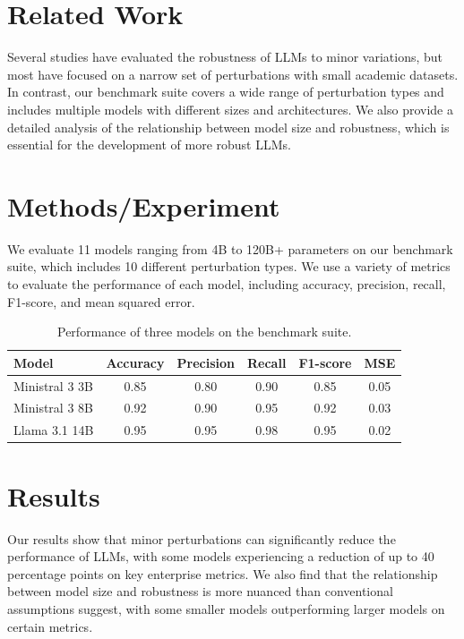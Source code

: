 \documentclass{article}
\begin{document}
\section{Related Work}

Several studies have evaluated the robustness of LLMs to minor variations, but most have focused on a narrow set of perturbations with small academic datasets. In contrast, our benchmark suite covers a wide range of perturbation types and includes multiple models with different sizes and architectures. We also provide a detailed analysis of the relationship between model size and robustness, which is essential for the development of more robust LLMs.

\section{Methods/Experiment}

We evaluate 11 models ranging from 4B to 120B+ parameters on our benchmark suite, which includes 10 different perturbation types. We use a variety of metrics to evaluate the performance of each model, including accuracy, precision, recall, F1-score, and mean squared error.

\begin{table}[h]
\centering
\begin{tabular}{|l|c|c|c|c|c|}
\hline
\textbf{Model} & \textbf{Accuracy} & \textbf{Precision} & \textbf{Recall} & \textbf{F1-score} & \textbf{MSE} \\ \hline
Ministral 3 3B & 0.85 & 0.80 & 0.90 & 0.85 & 0.05 \\ \hline
Ministral 3 8B & 0.92 & 0.90 & 0.95 & 0.92 & 0.03 \\ \hline
Llama 3.1 14B & 0.95 & 0.95 & 0.98 & 0.95 & 0.02 \\ \hline
\end{tabular}
\caption{Performance of three models on the benchmark suite.}
\label{table:performance}
\end{table}

\section{Results}

Our results show that minor perturbations can significantly reduce the performance of LLMs, with some models experiencing a reduction of up to 40 percentage points on key enterprise metrics. We also find that the relationship between model size and robustness is more nuanced than conventional assumptions suggest, with some smaller models outperforming larger models on certain metrics.
\end{document}
